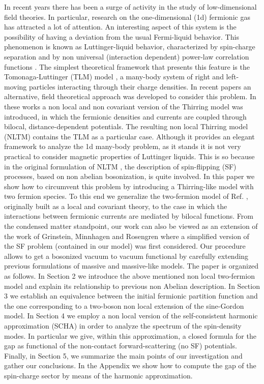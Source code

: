 \documentclass[a4paper,a4paper]{article}
\begin{document}
In recent years there has been a surge of activity in the study of low-dimensional
field theories. In particular, research on the one-dimensional (1d) fermionic gas has
attracted a lot of attention. An interesting aspect of this system is the possibility
of having a deviation from the usual Fermi-liquid behavior. This phenomenon is known
as Luttinger-liquid behavior, characterized by spin-charge separation and by non
universal (interaction dependent) power-law correlation functions  \cite{Voit}. The
simplest theoretical framework that presents this feature is the Tomonaga-Luttinger
(TLM) model \cite{TLM}, a many-body system of right and left-moving particles
interacting through their charge densities. In recent papers \cite{NLT1} \cite{NLT2}
\cite{NLT3} an alternative, field theoretical approach was developed to consider this
problem. In these works a non local and non covariant version of the Thirring model
was introduced, in which the fermionic densities and currents are coupled through
bilocal, distance-dependent potentials. The resulting non local Thirring model (NLTM)
contains the TLM as a particular case. Although it provides an elegant framework to
analyze the 1d many-body problem, as it stands it is not very practical to consider
magnetic properties of Luttinger liquids. This is so because in the original
formulation of NLTM \cite{NLT1}, the description of spin-flipping (SF) processes,
based on non abelian bosonization, is quite involved. In this paper we show how to
circumvent this problem by introducing a Thirring-like model with two fermion species.
To this end we generalize the two-fermion model of Ref. \cite{Zinn-Justin}, originally
built as a local and covariant theory, to the case in which the interactions between
fermionic currents are mediated by bilocal functions. From the condensed matter
standpoint, our work can also be viewed as an extension of the work of Grinstein,
Minnhagen and Rosengren \cite{GMR} where a simplified version of the SF problem
(contained in our model) was first considered. Our procedure allows to get a bosonized
vacuum to vacuum functional by carefully extending previous formulations of massive
\cite{Coleman} \cite{Naon} and massive-like \cite{Li-Naon} models. The paper is
organized as follows. In Section 2 we introduce the above mentioned non local
two-fermion model and explain its relationship to previous non Abelian description. In
Section 3 we establish an equivalence between the initial fermionic partition function
and the one corresponding to a two-boson non local extension of the sine-Gordon model.
In Section 4 we employ a non local version of the self-consistent harmonic
approximation (SCHA) \cite{SCHA} in order to analyze the spectrum of the spin-density
modes. In particular we give, within this approximation, a closed formula for the gap
as functional of the non-contact forward-scattering (no SF) potentials. Finally, in
Section 5, we summarize the main points of our investigation and gather our
conclusions. In the Appendix we show how to compute the gap of the spin-charge sector
by means of the harmonic approximation.
\end{document}
